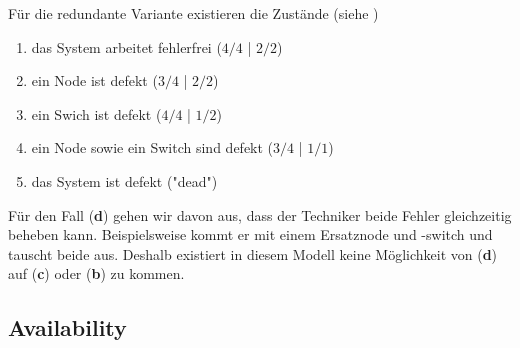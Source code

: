 \documentclass[
            a4paper
            ]{scrartcl}%
\begin{document}
Für die redundante Variante existieren die Zustände (siehe
)
\begin{enumerate}[\bfseries a.]
    \item das System arbeitet fehlerfrei ($4/4$ | $2/2$)
    \item ein Node ist defekt ($3/4$ | $2/2$)
    \item ein Swich ist defekt ($4/4$ | $1/2$)
    \item ein Node sowie ein Switch sind defekt ($3/4$ | $1/1$)
    \item das System ist defekt ("dead")
\end{enumerate}

Für den Fall (\textbf{d}) gehen wir davon aus, dass der Techniker beide Fehler gleichzeitig beheben kann. 
Beispielsweise kommt er mit einem Ersatznode und -switch und tauscht beide aus. 
Deshalb existiert in diesem Modell keine Möglichkeit von (\textbf{d}) auf
(\textbf{c}) oder (\textbf{b}) zu kommen.

\subsection{Availability}
\end{document}
